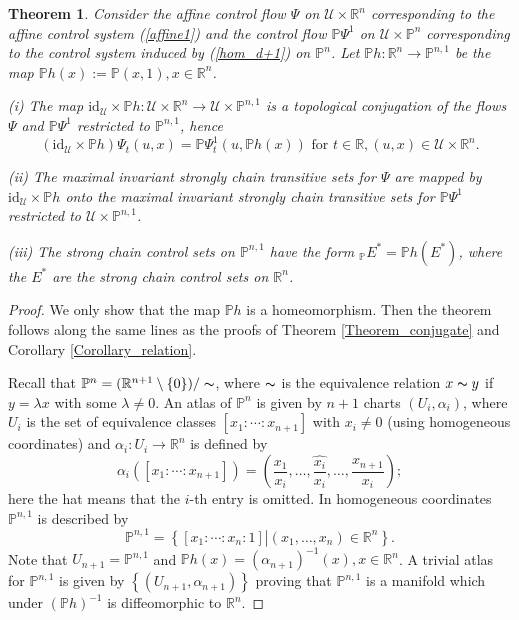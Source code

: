 \documentclass[preprint,12pt]{elsarticle}
\newtheorem{theorem}{Theorem}
\begin{document}
\begin{theorem}
\label{Theorem_projective}Consider the affine control flow $\Psi$ on
$\mathcal{U}\times\mathbb{R}^{n}$ corresponding to the affine control system
(\ref{affine1}) and the control flow $\mathbb{P}\Psi^{1}$ on $\mathcal{U}%
\times\mathbb{P}^{n}$ corresponding to the control system induced by
(\ref{hom_d+1}) on $\mathbb{P}^{n}$. Let $\mathbb{P}h:\mathbb{R}%
^{n}\rightarrow\mathbb{P}^{n,1}$ be the map $\mathbb{P}h(x):=\mathbb{P}%
(x,1),x\in\mathbb{R}^{n}$.

(i) The map $\mathrm{id}_{\mathcal{U}}\times\mathbb{P}h:\mathcal{U}%
\times\mathbb{R}^{n}\rightarrow\mathcal{U}\times\mathbb{P}^{n,1}$ is a
topological conjugation of the flows $\Psi$ and $\mathbb{P}\Psi^{1}$
restricted to $\mathbb{P}^{n,1}$, hence%
\[
\left(  \mathrm{id}_{\mathcal{U}}\times\mathbb{P}h\right)  \Psi_{t}%
(u,x)=\mathbb{P}\Psi_{t}^{1}(u,\mathbb{P}h(x))\text{ for }t\in\mathbb{R}%
,(u,x)\in\mathcal{U}\times\mathbb{R}^{n}.
\]


(ii) The maximal invariant strongly chain transitive sets for $\Psi$ are
mapped by $\mathrm{id}_{\mathcal{U}}\times\mathbb{P}h$ onto the maximal
invariant strongly chain transitive sets for $\mathbb{P}\Psi^{1}$ restricted
to $\mathcal{U}\times\mathbb{P}^{n,1}$.

(iii) The strong chain control sets on $\mathbb{P}^{n,1}$ have the form
$_{\mathbb{P}}E^{\ast}=\mathbb{P}h(E^{\ast})$, where the $E^{\ast}$ are the
strong chain control sets on $\mathbb{R}^{n}$.
\end{theorem}

\begin{proof}
We only show that the map $\mathbb{P}h$ is a homeomorphism. Then the theorem
follows along the same lines as the proofs of Theorem \ref{Theorem_conjugate}
and Corollary \ref{Corollary_relation}.

Recall that $\mathbb{P}^{n}=(\mathbb{R}^{n+1}\setminus\{0\})/\thicksim$, where
$\thicksim$ is the equivalence relation $x\thicksim y$ if $y=\lambda x$ with
some $\lambda\not =0$. An atlas of $\mathbb{P}^{n}$ is given by $n+1$ charts
$(U_{i},\alpha_{i})$, where $U_{i}$ is the set of equivalence classes
$[x_{1}:\cdots:x_{n+1}]$ with $x_{i}\not =0$ (using homogeneous coordinates)
and $\alpha_{i}:U_{i}\rightarrow\mathbb{R}^{n}$ is defined by
\[
\alpha_{i}([x_{1}:\cdots:x_{n+1}])=\left(  \frac{x_{1}}{x_{i}},\ldots
,\widehat{\frac{x_{i}}{x_{i}}},\ldots,\frac{x_{n+1}}{x_{i}}\right)  ;
\]
here the hat means that the $i$-th entry is omitted. In homogeneous
coordinates $\mathbb{P}^{n,1}$ is described by
\[
\mathbb{P}^{n,1}=\left\{  [x_{1}:\cdots:x_{n}:1]\left\vert (x_{1},\ldots
,x_{n})\in\mathbb{R}^{n}\right.  \right\}  .
\]
Note that $U_{n+1}=\mathbb{P}^{n,1}$ and $\mathbb{P}h(x)=\left(  \alpha
_{n+1}\right)  ^{-1}(x),x\in\mathbb{R}^{n}$. A trivial atlas for
$\mathbb{P}^{n,1}$ is given by $\left\{  (U_{n+1},\alpha_{n+1})\right\}  $
proving that $\mathbb{P}^{n,1}$ is a manifold which under $\left(
\mathbb{P}h\right)  ^{-1}$ is diffeomorphic to $\mathbb{R}^{n}$.
\end{proof}
\end{document}

